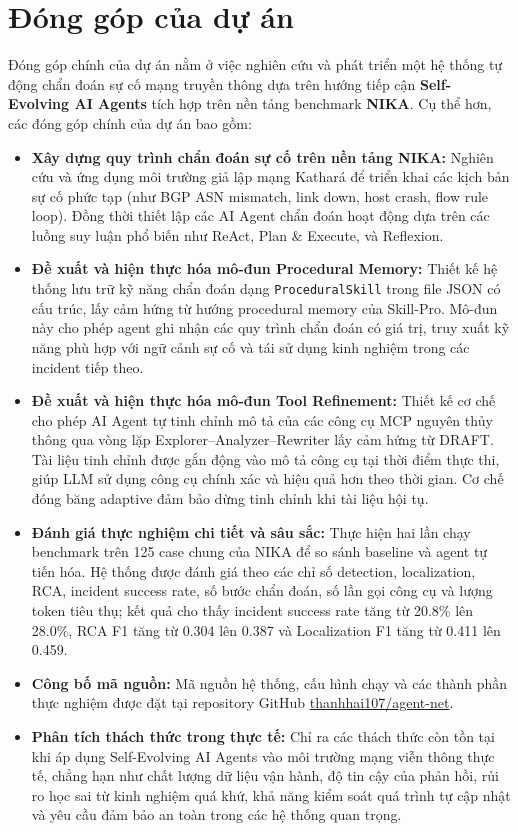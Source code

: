\section{Đóng góp của dự án}
\label{sec:contributions}

Đóng góp chính của dự án nằm ở việc nghiên cứu và phát triển một hệ thống tự động chẩn đoán sự cố mạng truyền thông dựa trên hướng tiếp cận \textbf{Self-Evolving AI Agents} tích hợp trên nền tảng benchmark \textbf{NIKA}. Cụ thể hơn, các đóng góp chính của dự án bao gồm:

\begin{itemize}
    \item \textbf{Xây dựng quy trình chẩn đoán sự cố trên nền tảng NIKA:} Nghiên cứu và ứng dụng môi trường giả lập mạng Kathará để triển khai các kịch bản sự cố phức tạp (như BGP ASN mismatch, link down, host crash, flow rule loop). Đồng thời thiết lập các AI Agent chẩn đoán hoạt động dựa trên các luồng suy luận phổ biến như ReAct, Plan \& Execute, và Reflexion.

\item \textbf{Đề xuất và hiện thực hóa mô-đun Procedural Memory:} Thiết kế hệ thống lưu trữ kỹ năng chẩn đoán dạng \texttt{ProceduralSkill} trong file JSON có cấu trúc, lấy cảm hứng từ hướng procedural memory của Skill-Pro. Mô-đun này cho phép agent ghi nhận các quy trình chẩn đoán có giá trị, truy xuất kỹ năng phù hợp với ngữ cảnh sự cố và tái sử dụng kinh nghiệm trong các incident tiếp theo.

\item \textbf{Đề xuất và hiện thực hóa mô-đun Tool Refinement:} Thiết kế cơ chế cho phép AI Agent tự tinh chỉnh mô tả của các công cụ MCP nguyên thủy thông qua vòng lặp Explorer--Analyzer--Rewriter lấy cảm hứng từ DRAFT. Tài liệu tinh chỉnh được gắn động vào mô tả công cụ tại thời điểm thực thi, giúp LLM sử dụng công cụ chính xác và hiệu quả hơn theo thời gian. Cơ chế đóng băng adaptive đảm bảo dừng tinh chỉnh khi tài liệu hội tụ.

    \item \textbf{Đánh giá thực nghiệm chi tiết và sâu sắc:} Thực hiện hai lần chạy benchmark trên 125 case chung của NIKA để so sánh baseline và agent tự tiến hóa. Hệ thống được đánh giá theo các chỉ số detection, localization, RCA, incident success rate, số bước chẩn đoán, số lần gọi công cụ và lượng token tiêu thụ; kết quả cho thấy incident success rate tăng từ 20.8\% lên 28.0\%, RCA F1 tăng từ 0.304 lên 0.387 và Localization F1 tăng từ 0.411 lên 0.459.

    \item \textbf{Công bố mã nguồn:} Mã nguồn hệ thống, cấu hình chạy và các thành phần thực nghiệm được đặt tại repository GitHub \href{https://github.com/thanhhai107/agent-net}{thanhhai107/agent-net}.

    \item \textbf{Phân tích thách thức trong thực tế:} Chỉ ra các thách thức còn tồn tại khi áp dụng Self-Evolving AI Agents vào môi trường mạng viễn thông thực tế, chẳng hạn như chất lượng dữ liệu vận hành, độ tin cậy của phản hồi, rủi ro học sai từ kinh nghiệm quá khứ, khả năng kiểm soát quá trình tự cập nhật và yêu cầu đảm bảo an toàn trong các hệ thống quan trọng.

\end{itemize}
